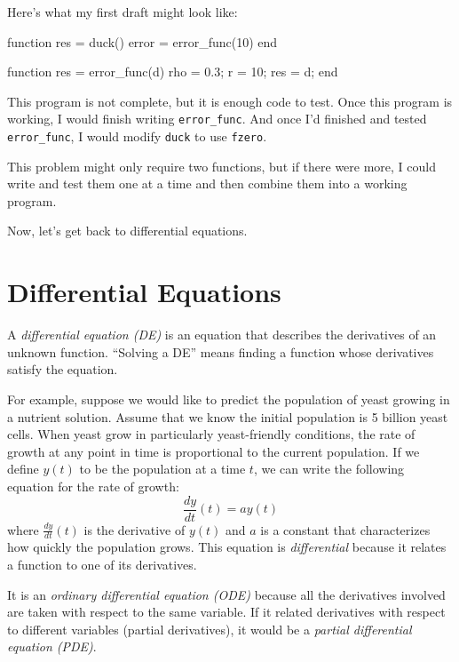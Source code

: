 Here's what my first draft might look like:

\begin{code}
function res = duck()
    error = error_func(10)
end

function res = error_func(d)
    rho = 0.3;      %
    r = 10;         %
    res = d;
end
\end{code}

This program is not complete, but it is enough code to test.
Once this program is working, I would finish writing \lstinline{error_func}.
And once I'd finished and tested \lstinline{error_func}, I would modify
\lstinline{duck} to use \lstinline{fzero}.

This problem might only require two functions, but if there
were more, I could write and test them one at a time and then
combine them into a working program.

Now, let's get back to differential equations.


\section{Differential Equations}
\label{diffeq}

A \emph{differential equation (DE)} is an equation that describes the
derivatives of an unknown function.  ``Solving a DE'' means finding a
function whose derivatives satisfy the equation.


For example, suppose we would like to predict the population of yeast growing in a nutrient solution.  Assume that we know the initial population is 5 billion yeast cells.
When yeast grow in particularly yeast-friendly
conditions, the rate of growth at any point in time is proportional to the current population.  If we define $y(t)$ to be the population at a time $t$, we can write the following equation for the rate of growth:
%
\begin{equation*}
\frac{dy}{dt}(t) = a y(t)
\end{equation*}
%
where $\frac{dy}{dt}(t)$ is the derivative of $y(t)$ and
$a$ is a constant that characterizes how quickly the population
grows.
This equation is \emph{differential} because it relates a function to one of its derivatives.


It is an \emph{ordinary differential equation (ODE)} because all the
derivatives involved are taken with respect to the
same variable.
If it related derivatives with respect to
different variables (partial derivatives), it would be a \emph{partial
differential equation (PDE)}.

